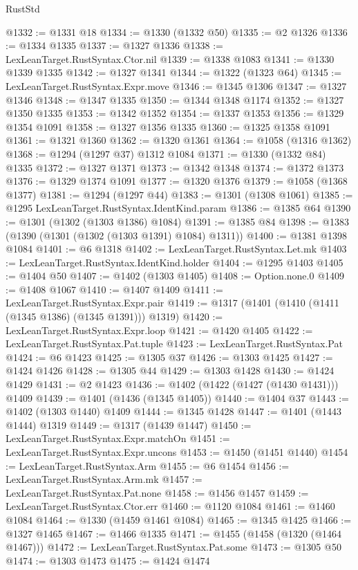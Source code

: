 \begin{lexlean}{RustStd}
\begin{coremodule}
@1332 := @1331 @18
@1334 := @1330 (@1332 @50)
@1335 := @2 @1326
@1336 := @1334 @1335
@1337 := @1327 @1336
@1338 := LexLeanTarget.RustSyntax.Ctor.nil
@1339 := @1338 @1083
@1341 := @1330 @1339 @1335
@1342 := @1327 @1341
@1344 := @1322 (@1323 @64)
@1345 := LexLeanTarget.RustSyntax.Expr.move
@1346 := @1345 @1306
@1347 := @1327 @1346
@1348 := @1347 @1335
@1350 := @1344 @1348 @1174
@1352 := @1327 @1350 @1335
@1353 := @1342 @1352
@1354 := @1337 @1353
@1356 := @1329 @1354 @1091
@1358 := @1327 @1356 @1335
@1360 := @1325 @1358 @1091
@1361 := @1321 @1360
@1362 := @1320 @1361
@1364 := @1058 (@1316 @1362)
@1368 := @1294 (@1297 @37) @1312 @1084
@1371 := @1330 (@1332 @84) @1335
@1372 := @1327 @1371
@1373 := @1342 @1348
@1374 := @1372 @1373
@1376 := @1329 @1374 @1091
@1377 := @1320 @1376
@1379 := @1058 (@1368 @1377)
@1381 := @1294 (@1297 @44)
@1383 := @1301 (@1308 @1061)
@1385 := @1295 LexLeanTarget.RustSyntax.IdentKind.param
@1386 := @1385 @64
@1390 := @1301 (@1302 (@1303 @1386) @1084)
@1391 := @1385 @84
@1398 := @1383 (@1390 (@1301 (@1302 (@1303 @1391) @1084) @1311))
@1400 := @1381 @1398 @1084
@1401 := @6 @1318
@1402 := LexLeanTarget.RustSyntax.Let.mk
@1403 := LexLeanTarget.RustSyntax.IdentKind.holder
@1404 := @1295 @1403
@1405 := @1404 @50
@1407 := @1402 (@1303 @1405)
@1408 := Option.none.{0}
@1409 := @1408 @1067
@1410 := @1407 @1409
@1411 := LexLeanTarget.RustSyntax.Expr.pair
@1419 := @1317 (@1401 (@1410 (@1411 (@1345 @1386) (@1345 @1391))) @1319)
@1420 := LexLeanTarget.RustSyntax.Expr.loop
@1421 := @1420 @1405
@1422 := LexLeanTarget.RustSyntax.Pat.tuple
@1423 := LexLeanTarget.RustSyntax.Pat
@1424 := @6 @1423
@1425 := @1305 @37
@1426 := @1303 @1425
@1427 := @1424 @1426
@1428 := @1305 @44
@1429 := @1303 @1428
@1430 := @1424 @1429
@1431 := @2 @1423
@1436 := @1402 (@1422 (@1427 (@1430 @1431))) @1409
@1439 := @1401 (@1436 (@1345 @1405))
@1440 := @1404 @37
@1443 := @1402 (@1303 @1440) @1409
@1444 := @1345 @1428
@1447 := @1401 (@1443 @1444) @1319
@1449 := @1317 (@1439 @1447)
@1450 := LexLeanTarget.RustSyntax.Expr.matchOn
@1451 := LexLeanTarget.RustSyntax.Expr.uncons
@1453 := @1450 (@1451 @1440)
@1454 := LexLeanTarget.RustSyntax.Arm
@1455 := @6 @1454
@1456 := LexLeanTarget.RustSyntax.Arm.mk
@1457 := LexLeanTarget.RustSyntax.Pat.none
@1458 := @1456 @1457
@1459 := LexLeanTarget.RustSyntax.Ctor.err
@1460 := @1120 @1084
@1461 := @1460 @1084
@1464 := @1330 (@1459 @1461 @1084)
@1465 := @1345 @1425
@1466 := @1327 @1465
@1467 := @1466 @1335
@1471 := @1455 (@1458 (@1320 (@1464 @1467)))
@1472 := LexLeanTarget.RustSyntax.Pat.some
@1473 := @1305 @50
@1474 := @1303 @1473
@1475 := @1424 @1474

\end{coremodule}
\end{lexlean}
